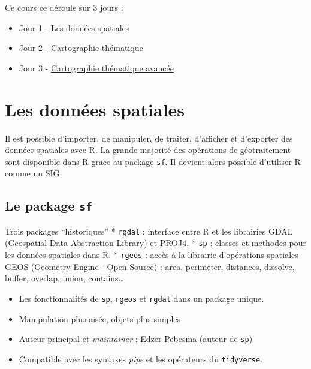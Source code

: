 \documentclass[]{book}
\providecommand{\tightlist}{%
  \setlength{\itemsep}{0pt}\setlength{\parskip}{0pt}}
\begin{document}
Ce cours ce déroule sur 3 jours :

\begin{itemize}
\tightlist
\item
  Jour 1 - \protect\hyperlink{jour1}{Les données spatiales}\\
\item
  Jour 2 - \protect\hyperlink{jour2}{Cartographie thématique}\\
\item
  Jour 3 - \protect\hyperlink{jour3}{Cartographie thématique avancée}
\end{itemize}

\hypertarget{jour1}{%
\chapter{Les données spatiales}\label{jour1}}

Il est possible d'importer, de manipuler, de traiter, d'afficher et d'exporter des données spatiales avec R. La grande majorité des opérations de géotraitement sont disponible dans R grace au package \texttt{sf}. Il devient alors possible d'utiliser R comme un SIG.

\hypertarget{le-package-sf}{%
\section{\texorpdfstring{Le package \texttt{sf}}{Le package sf}}\label{le-package-sf}}

Trois packages ``historiques''
* \texttt{rgdal} : interface entre R et les librairies GDAL (\href{http://www.gdal.org/}{Geospatial Data Abstraction Library}) et \href{https://github.com/OSGeo/proj.4}{PROJ4}.
* \texttt{sp} : classes et methodes pour les données spatiales dans R.
* \texttt{rgeos} : accès à la librairie d'opérations spatiales GEOS (\href{http://trac.osgeo.org/geos/}{Geometry Engine - Open Source}) : area, perimeter, distances, dissolve, buffer, overlap, union, contains\ldots{}

\begin{itemize}
\item
  Les fonctionnalités de \texttt{sp}, \texttt{rgeos} et \texttt{rgdal} dans un package unique.
\item
  Manipulation plus aisée, objets plus simples
\item
  Auteur principal et \emph{maintainer} : Edzer Pebesma (auteur de \texttt{sp})
\item
  Compatible avec les syntaxes \emph{pipe} et les opérateurs du \texttt{tidyverse}.
\end{itemize}
\end{document}
